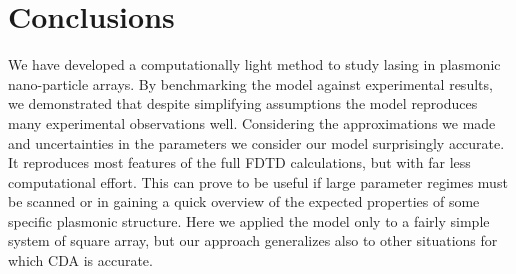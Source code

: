 \documentclass{iopart}
\begin{document}
\section{Conclusions}
We have developed a computationally light method to study lasing in plasmonic nano-particle arrays. By benchmarking the model against
experimental results,
we demonstrated that despite simplifying assumptions the model reproduces many experimental
observations well. 
Considering the approximations we made and uncertainties in the parameters we consider
our model surprisingly accurate. It reproduces most features of the full FDTD calculations, but
with far less computational effort. This can prove to be useful if large parameter
regimes must be scanned or in gaining a quick overview of the expected properties of some specific plasmonic structure.
Here we applied the model only to a fairly simple system of square array, but our approach generalizes also to other situations for which CDA
is accurate.




\vspace{1cm}

%


\end{document}
